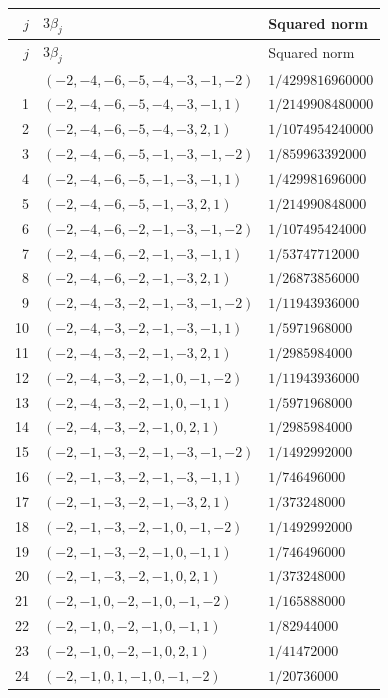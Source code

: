 \begingroup\scriptsize
\setlength{\tabcolsep}{5pt}
\begin{longtable}{@{}rll@{}}
\toprule
$j$ & $3\beta_j$ & Squared norm\\
\midrule\endfirsthead
\toprule
$j$ & $3\beta_j$ & Squared norm\\
\midrule\endhead
\bottomrule\endfoot
0 & $(-2,-4,-6,-5,-4,-3,-1,-2)$ & $1/4299816960000$\\
1 & $(-2,-4,-6,-5,-4,-3,-1,1)$ & $1/2149908480000$\\
2 & $(-2,-4,-6,-5,-4,-3,2,1)$ & $1/1074954240000$\\
3 & $(-2,-4,-6,-5,-1,-3,-1,-2)$ & $1/859963392000$\\
4 & $(-2,-4,-6,-5,-1,-3,-1,1)$ & $1/429981696000$\\
5 & $(-2,-4,-6,-5,-1,-3,2,1)$ & $1/214990848000$\\
6 & $(-2,-4,-6,-2,-1,-3,-1,-2)$ & $1/107495424000$\\
7 & $(-2,-4,-6,-2,-1,-3,-1,1)$ & $1/53747712000$\\
8 & $(-2,-4,-6,-2,-1,-3,2,1)$ & $1/26873856000$\\
9 & $(-2,-4,-3,-2,-1,-3,-1,-2)$ & $1/11943936000$\\
10 & $(-2,-4,-3,-2,-1,-3,-1,1)$ & $1/5971968000$\\
11 & $(-2,-4,-3,-2,-1,-3,2,1)$ & $1/2985984000$\\
12 & $(-2,-4,-3,-2,-1,0,-1,-2)$ & $1/11943936000$\\
13 & $(-2,-4,-3,-2,-1,0,-1,1)$ & $1/5971968000$\\
14 & $(-2,-4,-3,-2,-1,0,2,1)$ & $1/2985984000$\\
15 & $(-2,-1,-3,-2,-1,-3,-1,-2)$ & $1/1492992000$\\
16 & $(-2,-1,-3,-2,-1,-3,-1,1)$ & $1/746496000$\\
17 & $(-2,-1,-3,-2,-1,-3,2,1)$ & $1/373248000$\\
18 & $(-2,-1,-3,-2,-1,0,-1,-2)$ & $1/1492992000$\\
19 & $(-2,-1,-3,-2,-1,0,-1,1)$ & $1/746496000$\\
20 & $(-2,-1,-3,-2,-1,0,2,1)$ & $1/373248000$\\
21 & $(-2,-1,0,-2,-1,0,-1,-2)$ & $1/165888000$\\
22 & $(-2,-1,0,-2,-1,0,-1,1)$ & $1/82944000$\\
23 & $(-2,-1,0,-2,-1,0,2,1)$ & $1/41472000$\\
24 & $(-2,-1,0,1,-1,0,-1,-2)$ & $1/20736000$\\

\end{longtable}
